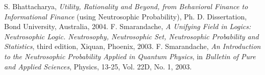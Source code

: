 \documentclass[12pt]{article}
\begin{document}
\begin{thebibliography}{9}
 S. Bhattacharya, {\em Utility, Rationality and Beyond, from Behavioral Finance to Informational Finance} (using Neutrosophic Probability), Ph. D. Dissertation, Bond University, Australia, 2004.
 F. Smarandache, {\em A Unifying Field in Logics: Neutrosophic Logic. Neutrosophy, Neutrosophic Set, Neutrosophic Probability and Statistics}, third edition, Xiquan, Phoenix, 2003.
 F. Smarandache, {\em An Introduction to the Neutrosophic Probability Applied in Quantum Physics}, in {\it Bulletin of Pure and Applied Sciences}, Physics, 13-25, Vol. 22D, No. 1, 2003.
\end{thebibliography}
\end{document}
